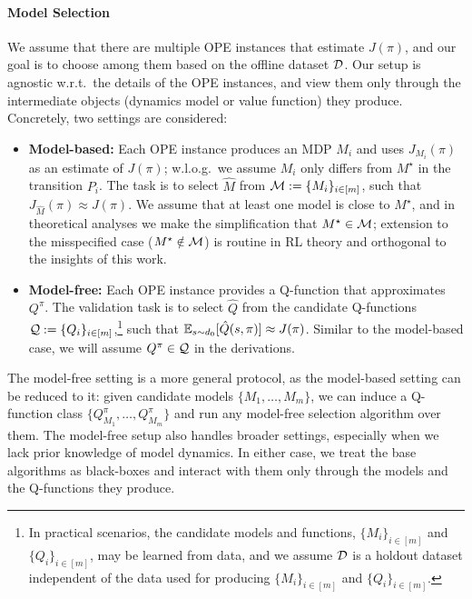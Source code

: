 \paragraph{Model Selection} We assume that there are multiple OPE instances that estimate $J(\pi)$, and our goal is to choose among them based on the offline dataset $\mathcal{D}$. %
Our setup is agnostic w.r.t.~the details of the OPE instances, and view them only through the intermediate objects (dynamics model or value function) they produce. Concretely, two settings are considered:
\begin{itemize}[leftmargin=*]
\item \textbf{Model-based:} Each OPE instance %
produces an MDP $M_i$ and uses $J_{M_i}(\pi)$ as an estimate of $J(\pi)$; w.l.o.g.~we assume $M_i$ only differs from $M^\star$ in the transition $P_i$.  The  task is to select $\hat M$ from $\mathcal{M}:=\{M_i\}_{i\in[m]}$, such that $J_{\hat M}(\pi) \approx J(\pi)$. We  assume that at least one model is close to $M^\star$, and in theoretical analyses we make the simplification that $M^\star \in \mathcal{M}$; extension to the misspecified case ($M^\star\notin \mathcal{M}$) is routine in RL theory \cite{amortila2023optimal,amortila2024mitigating} and orthogonal to the insights of this work. %
\item \textbf{Model-free:} Each OPE instance provides a Q-function that approximates $Q^\pi$. The validation task is to select $\hat Q$ from the candidate Q-functions $\mathcal{Q}:=\{Q_i\}_{i\in[m]}$,\footnote{In practical scenarios, the candidate models and functions, $\{M_i\}_{i\in[m]}$ and $\{Q_i\}_{i\in[m]}$, may be learned from data, and we assume $\mathcal{D}$ is a holdout dataset  independent of the data used for producing $\{M_i\}_{i\in[m]}$ and $\{Q_i\}_{i\in[m]}$.}  such that $\mathbb{E}_{s\sim d_0}[{\hat Q}(s, \pi)] \approx J(\pi)$. Similar to the model-based case, we will assume $Q^\pi \in \mathcal{Q}$ in the derivations.
\end{itemize}

The model-free setting is a more general protocol, as the model-based setting can be reduced to it: given candidate models $\{M_1, \ldots, M_m\}$, we can induce a Q-function class $\{Q_{M_1}^\pi, \ldots, Q_{M_m}^\pi\}$ and run any model-free selection algorithm over them. The model-free setup also handles broader settings, especially when we lack prior knowledge of model dynamics. In either case, we treat the base algorithms as black-boxes and interact with them only through the models and the Q-functions they produce. 

